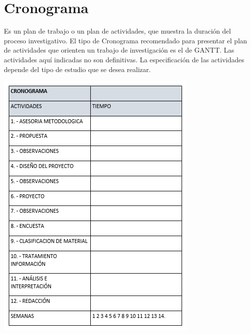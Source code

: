 \documentclass[12pt,letterpaper]{article}
\begin{document}
\newpage
 \section*{Cronograma}
  
\begin{flushleft}
Es un plan de trabajo o un plan de actividades, que muestra la duración del proceso investigativo. El tipo de Cronograma recomendado para presentar el plan de actividades que orienten un trabajo de investigación es el de GANTT. Las actividades aquí indicadas no son definitivas. La especificación de las actividades depende del tipo de estudio que se desea realizar.
\end{flushleft}

\begin{center}
\includegraphics[scale=1]{imag11.PNG} 
\end{center}
 
\end{document}
